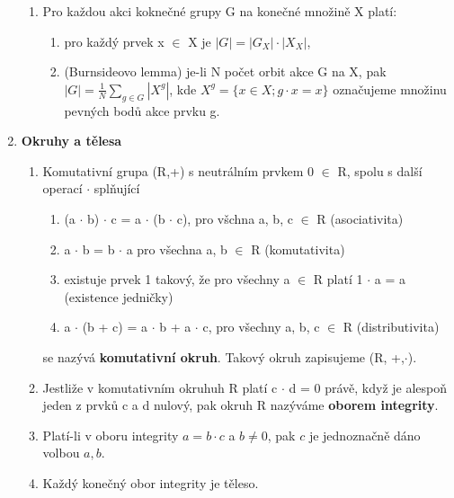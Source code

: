 \documentclass[12pt,a4paper]{article}
\begin{document}
\begin{enumerate}
\begin{enumerate}
		\item Pro každou akci koknečné grupy G na konečné množině X platí:
		\begin{enumerate}
			\item pro každý prvek x $\in$ X je $|G| = |G_X|\cdot |X_X|$,
			\item (Burnsideovo lemma) je-li N počet orbit akce G na X, pak $|G| = \frac{1}{N}\sum_{g\in G}|X^g|$, kde $X^g = \{x \in X; g\cdot x = x\}$ označujeme množinu pevných bodů akce prvku g.
		\end{enumerate}
	\end{enumerate}

	\item \textbf{Okruhy a tělesa}
	\begin{enumerate}
		\item Komutativní grupa (R,+) s neutrálním prvkem 0 $\in$ R, spolu s další operací $\cdot$ splňující
		 \begin{enumerate}
		 	\item (a $\cdot$ b) $\cdot$ c = a $\cdot$ (b $\cdot$ c), pro všchna a, b, c $\in$ R (asociativita)
		 	\item a $\cdot$ b = b $\cdot$ a pro všechna a, b $\in$ R (komutativita)
		 	\item existuje prvek 1 takový, že pro všechny a $\in$ R platí 1 $\cdot$ a = a (existence jedničky)
		 	\item a $\cdot$ (b + c) = a $\cdot$ b + a $\cdot$ c, pro všechny a, b, c $\in$ R (distributivita)
		 \end{enumerate}
	 	se nazývá \textbf{komutativní okruh}. Takový okruh zapisujeme (R, +,$\cdot$).
	 	
	 	\item Jestliže v komutativním okruhuh R platí c $\cdot$ d = 0 právě, když je alespoň jeden z prvků c a d nulový, pak okruh R nazýváme \textbf{oborem integrity}.
	 	
	 	\item Platí-li v oboru integrity $a=b\cdot c$ a $b\neq0$, pak $c$ je jednoznačně dáno volbou $a,b$.
	 	
		\item Každý konečný obor integrity je těleso.	 	
	\end{enumerate}
\end{enumerate}
	
\end{document}
